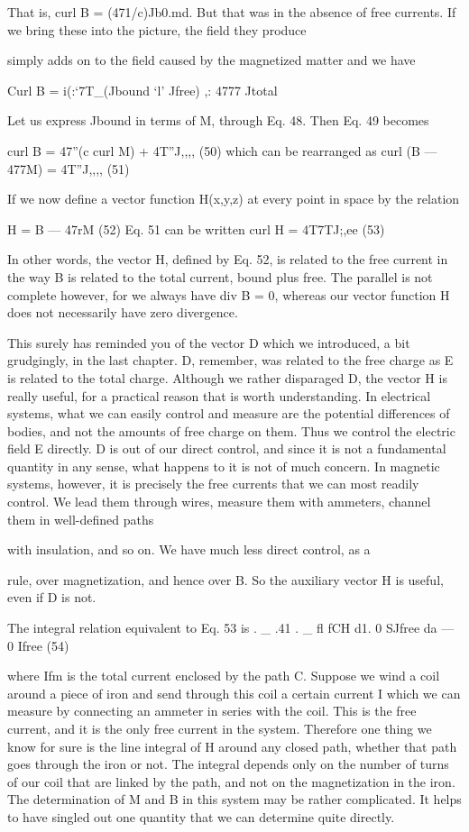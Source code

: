 {{{%
That is, curl B = (471/c)Jb0.md. But that was in the absence of free
currents. If we bring these into the picture, the field they produce

simply adds on to the field caused by the magnetized matter and
we have

Curl B = i(:‘7T_(Jbound ‘l' Jfree) ,: 4777 Jtotal 

Let us express Jbound in terms of M, through Eq. 48. Then Eq. 49
becomes

curl B = 47''(c curl M) + 4T''J,,,, (50)
which can be rearranged as
curl (B  ---  477M) = 4T''J,,,, (51)

If we now define a vector function H(x,y,z) at every point in space
by the relation

H = B  ---  47rM (52)
Eq. 51 can be written
curl H = 4T7TJ;,ee (53)

In other words, the vector H, defined by Eq. 52, is related to the
free current in the way B is related to the total current, bound plus
free. The parallel is not complete however, for we always have
div B = 0, whereas our vector function H does not necessarily have
zero divergence.

This surely has reminded you of the vector D which we introduced,
a bit grudgingly, in the last chapter. D, remember, was related to
the free charge as E is related to the total charge. Although we rather
disparaged D, the vector H is really useful, for a practical reason that
is worth understanding. In electrical systems, what we can easily
control and measure are the potential differences of bodies, and not
the amounts of free charge on them. Thus we control the electric
field E directly. D is out of our direct control, and since it is not a
fundamental quantity in any sense, what happens to it is not of much
concern. In magnetic systems, however, it is precisely the free currents
that we can most readily control. We lead them through wires,
measure them with ammeters, channel them in well-defined paths

with insulation, and so on. We have much less direct control, as a

rule, over magnetization, and hence over B. So the auxiliary vector
H is useful, even if D is not.

The integral relation equivalent to Eq. 53 is
. _ .41 . _ fl
fCH d1. 0 SJfree da ---  0 Ifree (54)

where Ifm is the total current enclosed by the path C. Suppose we
wind a coil around a piece of iron and send through this coil a certain
current I which we can measure by connecting an ammeter in
series with the coil. This is the free current, and it is the only free
current in the system. Therefore one thing we know for sure is the
line integral of H around any closed path, whether that path goes
through the iron or not. The integral depends only on the number
of turns of our coil that are linked by the path, and not on the magnetization
in the iron. The determination of M and B in this system
may be rather complicated. It helps to have singled out one quantity
that we can determine quite directly.

}}}
